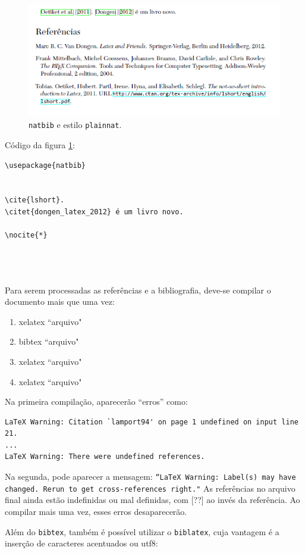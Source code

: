 \begin{figure}
\centering
\includegraphics[width=0.7\linewidth]{./natbib-test-plainnat}
\caption{\texttt{natbib} e estilo \texttt{plainnat}.}
\label{fig:natbib-test-plainnat}
\end{figure}

Código da figura \ref{fig:natbib-test-plainnat}:

\begin{verbatim}
\usepackage{natbib}


\cite{lshort}.
\citet{dongen_latex_2012} é um livro novo.

\nocite{*}




\end{verbatim}



Para serem processadas as referências e a bibliografia, deve-se compilar o documento mais que uma vez:

\begin{enumerate}
\item xelatex ``arquivo" \item 
bibtex ``arquivo" \item
xelatex ``arquivo" \item 
xelatex ``arquivo" 
\end{enumerate}


Na primeira compilação, aparecerão ``erros'' como:

\begin{verbatim}
LaTeX Warning: Citation `lamport94' on page 1 undefined on input line 21.
...
LaTeX Warning: There were undefined references.
\end{verbatim}


Na segunda, pode aparecer a mensagem: \texttt{``LaTeX Warning: Label(s) may have changed. Rerun to get cross-references right."} As referências no arquivo final ainda estão indefinidas ou mal definidas, com [??] ao invés da referência. Ao compilar mais uma vez, esses erros desaparecerão.

Além do \texttt{bibtex}, também é possível utilizar o \texttt{biblatex}, cuja vantagem é a inserção de caracteres acentuados ou utf8:

